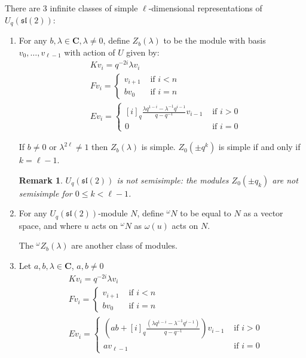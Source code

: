\documentclass[]{article}
\newtheorem{remark}[theorem]{Remark}
\numberwithin{equation}{subsection}
\begin{document}
There are $3$ infinite classes of simple $\ell$-dimensional representations of  $U_q(\mathfrak{sl}(2))$:
\begin{enumerate}
        \item For any $b,\lambda \in \mathbf{C}, \lambda \neq 0$, define
            $Z_b(\lambda)$ to be the module with basis $v_0, \ldots, v_{\ell -
            1}$ with action of $U$ given by: 
\begin{align*}
    &K v_i = q^{-2i} \lambda v_i \\
    &F v_i = \begin{cases} v_{i+1}& \text{ if $i < n$} \\  b v_0& \text{ if $i = n$} \end{cases}  \\
    &E v_i = \begin{cases} 
        [i]_q \frac{\lambda q^{1-i} - \lambda^{-1} q^{i-1}}{q - q^{-1}} v_{i-1}& \text{ if $i > 0$} \\ 
                    0& \text{ if $i = 0$} 
             \end{cases} 
\end{align*}

If $b \neq 0$ or $\lambda^{2\ell}\neq 1$ then $Z_b(\lambda)$ is simple.
$Z_0(\pm q^k)$ is simple if and only if $k = \ell - 1$. 

\begin{remark}
    $U_q(\mathfrak{sl}(2))$ is not semisimple: the modules $Z_0(\pm q_k)$ are not semisimple for $0 \leq k < \ell - 1$.
\end{remark}
\item For any $U_q(\mathfrak{sl}(2))$-module $N$, define $^\omega N$ to be
    equal to $N$ as a vector space, and where $u$ acts on $^\omega N$ as
    $\omega(u)$ acts on $N$.

    The $^\omega Z_b(\lambda)$ are another class of modules.
\item Let $a,b,\lambda \in \mathbf{C}$, $a,b\neq 0$
\begin{align*}
    &K v_i = q^{-2i} \lambda v_i \\
    &F v_i = \begin{cases} 
                v_{i+1}& \text{ if $i < n$} \\  
                b v_0& \text{ if $i = n$} 
             \end{cases}  \\
    &E v_i = \begin{cases} 
                \left(ab + [i]_q \frac{(\lambda q^{1-i} - \lambda^{-1} q^{i-1})}{q - q^{-1}}\right) v_{i-1}& \text{ if $i > 0$} \\ 
                a v_{\ell - 1}& \text{ if $i = 0$} 
             \end{cases} 
\end{align*}
\end{enumerate}
\end{document}
